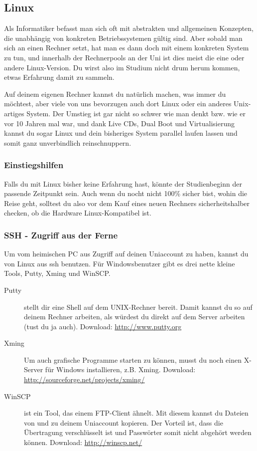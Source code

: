 \subsection{Linux}
	\label{linux}
	Als Informatiker befasst man sich oft mit abstrakten und allgemeinen Konzepten, die unabhängig von konkreten Betriebssystemen gültig sind. Aber sobald man sich an einen Rechner setzt, hat man es dann doch mit einem konkreten System zu tun, und innerhalb der Rechnerpools an der Uni ist dies meist die eine oder andere Linux-Version. Du wirst also im Studium nicht drum herum kommen, etwas Erfahrung damit zu sammeln.

	Auf deinem eigenen Rechner kannst du natürlich machen, was immer du möchtest, aber viele von uns bevorzugen auch dort Linux oder ein anderes Unix-artiges System. Der Umstieg ist gar nicht so schwer wie man denkt bzw. wie er vor 10 Jahren mal war, und dank Live CDs, Dual Boot und Virtualisierung kannst du sogar Linux und dein bisheriges System parallel laufen lassen und somit ganz unverbindlich reinschnuppern.

	\subsubsection{Einstiegshilfen}
		Falls du mit Linux bisher keine Erfahrung hast, könnte der Studienbeginn der passende Zeitpunkt sein. Auch wenn du nocht nicht 100\% sicher bist, wohin die Reise geht, solltest du also vor dem Kauf eines neuen Rechners sicherheitshalber checken, ob die Hardware Linux-Kompatibel ist.

	\subsubsection{SSH - Zugriff aus der Ferne}
		Um vom heimischen PC aus Zugriff auf deinen Uniaccount zu haben, kannst du von Linux aus ssh benutzen. Für Windowsbenutzer gibt es drei nette kleine Tools, Putty, Xming und WinSCP. %

		\begin{description}
			\item[Putty] stellt dir eine Shell auf dem UNIX-Rechner bereit. Damit kannst du so auf deinem Rechner arbeiten, als würdest du direkt
			  auf dem Server arbeiten (tust du ja auch).  Download: \url{http://www.putty.org}
			\item[Xming] Um auch grafische Programme starten zu können, musst du noch einen X-Server für Windows
			  installieren, z.B. Xming. Download: \url{http://sourceforge.net/projects/xming/}
			\item[WinSCP] ist ein Tool, das einem FTP-Client ähnelt. Mit diesem kannst du Dateien von und zu deinem Uniaccount kopieren. Der Vorteil ist, dass die Übertragung verschlüsselt ist und Passwörter somit nicht abgehört werden können. Download: \url{http://winscp.net/}
		\end{description}

